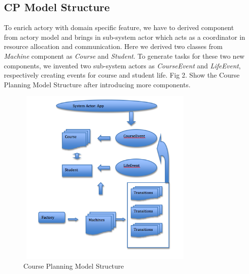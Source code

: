 \documentclass{sig-alternate}
\begin{document}
\subsection{CP Model Structure}
To enrich actory with domain specific feature, we have to derived component from actory model and brings in sub-system actor which acts as a coordinator in resource allocation and communication. Here we derived two classes from {\em Machine} component as {\em Course} and {\em Student}.    To generate tasks for these two new components, we invented two sub-system actors as {\em CourseEvent} and {\em LifeEvent}, respectively creating events for course and student life.  Fig 2. Show the Course Planning Model Structure after introducing more components.\\

\begin{figure}[!h]
\centering
\includegraphics[height=3.5in, width =3.5in ]{courseplanmodel}
\caption{Course Planning Model Structure}
\end{figure}
\end{document}
